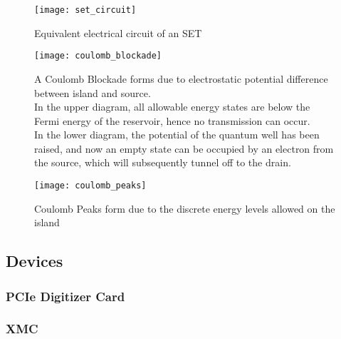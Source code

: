 \begin{figure}[htbp!]
	\centering
	\texttt{[image: set\_circuit]}
	\caption{Equivalent electrical circuit of an SET}
	\label{fig::set_circuit}
\end{figure}

\begin{figure}[htbp!]
	\centering
	\texttt{[image: coulomb\_blockade]}
	\caption{A Coulomb Blockade \cite{coulomb_blockade} forms due to electrostatic potential difference between island and source.\\ In the upper diagram, all allowable energy states are below the Fermi energy of the reservoir, hence no transmission can occur.\\ In the lower diagram, the potential of the quantum well has been raised, and now an empty state can be occupied by an electron from the source, which will subsequently tunnel off to the drain.}
	\label{coulomb_blockade}
\end{figure}

\begin{figure}[htbp!]
	\centering
	\texttt{[image: coulomb\_peaks]}
	\caption{Coulomb Peaks form due to the discrete energy levels allowed on the island}
	\label{fig::coulomb_peaks}
\end{figure}



\cite{nuclear_spin_readout}


\cite{bonato2015optimized}
\subsection{Devices}
\subsubsection{PCIe Digitizer Card}
\cite{ATS9440}
\subsubsection{XMC}
